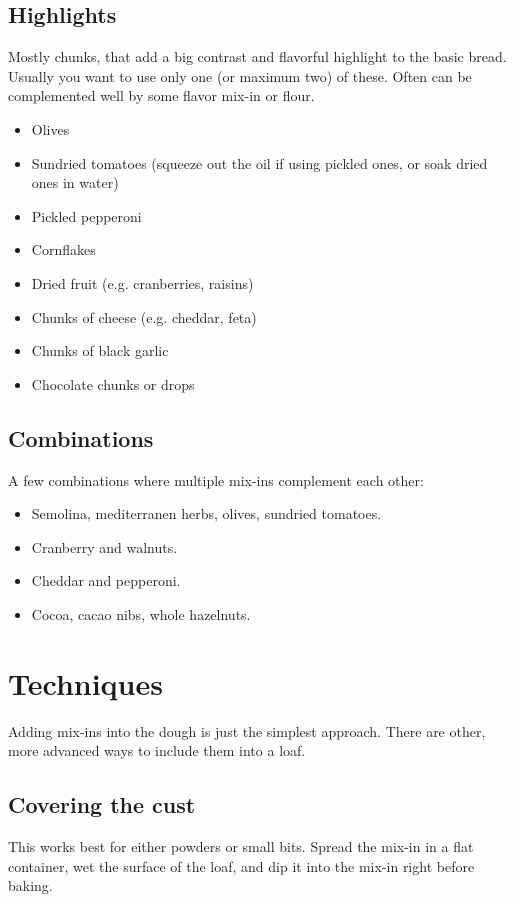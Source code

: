 \subsection{Highlights}
Mostly chunks, that add a big contrast and flavorful highlight to the basic
bread. Usually you want to use only one (or maximum two) of these. Often can
be complemented well by some flavor mix-in or flour.
\begin{itemize}
  \item Olives
  \item Sundried tomatoes (squeeze out the oil if using pickled ones, or soak
      dried ones in water)
  \item Pickled pepperoni
  \item Cornflakes
  \item Dried fruit (e.g. cranberries, raisins)
  \item Chunks of cheese (e.g. cheddar, feta)
  \item Chunks of black garlic
  \item Chocolate chunks or drops
\end{itemize}

\subsection{Combinations}
A few combinations where multiple mix-ins complement each other:
\begin{itemize}
  \item Semolina, mediterranen herbs, olives, sundried tomatoes.
  \item Cranberry and walnuts.
  \item Cheddar and pepperoni.
  \item Cocoa, cacao nibs, whole hazelnuts.
\end{itemize}

\section{Techniques}
Adding mix-ins into the dough is just the simplest approach. There are other,
more advanced ways to include them into a loaf.

\subsection{Covering the cust}
This works best for either powders or small bits. Spread the mix-in in a flat
container, wet the surface of the loaf, and dip it into the mix-in right
before baking.

